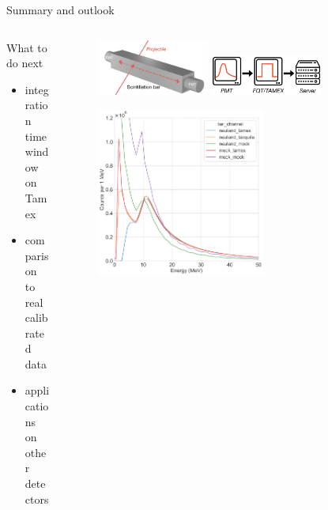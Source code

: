 \documentclass[compress, 13pt, aspectratio=169]{beamer}
\begin{document}
\begin{frame}{Summary and outlook}
\begin{columns}
\begin{column}{0.5\textwidth}
            \begin{exampleblock}{What to do next}
                \begin{itemize}
                    \item integration time window on Tamex
                    \item comparison to real calibrated data
                    \item applications on other detectors
                \end{itemize}
            \end{exampleblock}
        \end{column}
        \begin{column}{0.5\textwidth}
            \begin{figure}[t]
                \includegraphics[keepaspectratio, width = 0.4\textwidth]{Bar}%
                \includegraphics[keepaspectratio, width = 0.4\textwidth]{PMT2TAMEX.png}%
            \end{figure}
            \begin{figure}[t]
                \includegraphics[keepaspectratio, width = 0.6\textwidth]{Plots/EHitAll_E1_4n.png}%
            \end{figure}
        \end{column}
    \end{columns}
\end{frame}
    
\end{document}

